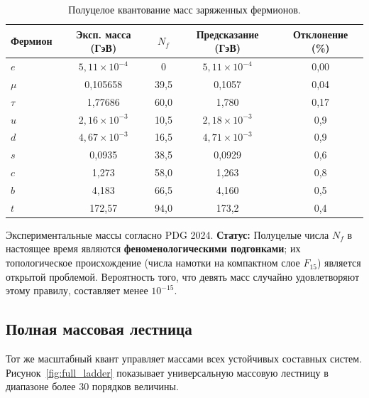 \documentclass[12pt,a4paper]{article}
\begin{document}
	\begin{table}[htbp]
		\centering
		\caption{Полуцелое квантование масс заряженных фермионов.}
		\label{tab:fermions}
		\begin{tabular}{l c c c c}
			\toprule
			Фермион & Эксп. масса (ГэВ) & \(N_f\) & Предсказание (ГэВ) & Отклонение (\%) \\
			\midrule
			\(e\)   & \(5,11\times10^{-4}\) & 0      & \(5,11\times10^{-4}\) & 0,00 \\
			\(\mu\)  & 0,105658             & 39,5   & 0,1057               & 0,04 \\
			\(\tau\) & 1,77686              & 60,0   & 1,780                & 0,17 \\
			\(u\)   & \(2,16\times10^{-3}\) & 10,5   & \(2,18\times10^{-3}\) & 0,9 \\
			\(d\)   & \(4,67\times10^{-3}\) & 16,5   & \(4,71\times10^{-3}\) & 0,9 \\
			\(s\)   & 0,0935               & 38,5   & 0,0929               & 0,6 \\
			\(c\)   & 1,273                & 58,0   & 1,263                & 0,8 \\
			\(b\)   & 4,183                & 66,5   & 4,160                & 0,5 \\
			\(t\)   & 172,57               & 94,0   & 173,2                & 0,4 \\
			\bottomrule
		\end{tabular}
		\par\smallskip
		\footnotesize
		Экспериментальные массы согласно PDG 2024. \textbf{Статус:} Полуцелые числа \(N_f\) в настоящее время являются \textbf{феноменологическими подгонками}; их топологическое происхождение (числа намотки на компактном слое \(F_{15}\)) является открытой проблемой. Вероятность того, что девять масс случайно удовлетворяют этому правилу, составляет менее \(10^{-15}\).
	\end{table}
	
	\subsection{Полная массовая лестница}
	
	Тот же масштабный квант управляет массами всех устойчивых составных систем. Рисунок~\ref{fig:full_ladder} показывает универсальную массовую лестницу в диапазоне более 30 порядков величины.
	
\end{document}
